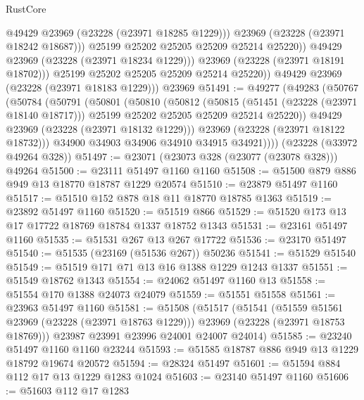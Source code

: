 \begin{lexlean}{RustCore}
\begin{coremodule}
                      @49429
                      @23969
                      (@23228 (@23971 @18285 @1229)))
                    @23969
                    (@23228 (@23971 @18242 @18687)))
                  @25199
                  @25202
                  @25205
                  @25209
                  @25214
                  @25220))
              @49429
              @23969
              (@23228 (@23971 @18234 @1229)))
            @23969
            (@23228 (@23971 @18191 @18702)))
          @25199
          @25202
          @25205
          @25209
          @25214
          @25220))
      @49429
      @23969
      (@23228 (@23971 @18183 @1229)))
    @23969
@51491 := @49277
    (@49283
      (@50767
        (@50784
          (@50791
            (@50801
              (@50810
                (@50812
                  (@50815
                    (@51451 (@23228 (@23971 @18140 @18717)))
                    @25199
                    @25202
                    @25205
                    @25209
                    @25214
                    @25220))
                @49429
                @23969
                (@23228 (@23971 @18132 @1229)))
              @23969
              (@23228 (@23971 @18122 @18732)))
            @34900
            @34903
            @34906
            @34910
            @34915
            @34921))))
    (@23228 (@33972 @49264 @328))
@51497 := @23071 (@23073 @328 (@23077 (@23078 @328))) @49264
@51500 := @23111 @51497 @1160 @1160
@51508 := @51500 @879 @886 @949 @13 @18770 @18787 @1229 @20574
@51510 := @23879 @51497 @1160
@51517 := @51510 @152 @878 @18 @11 @18770 @18785 @1363
@51519 := @23892 @51497 @1160
@51520 := @51519 @866
@51529 := @51520 @173 @13 @17 @17722 @18769 @18784 @1337 @18752 @1343
@51531 := @23161 @51497 @1160
@51535 := @51531 @267 @13 @267 @17722
@51536 := @23170 @51497
@51540 := @51535 (@23169 (@51536 @267)) @50236
@51541 := @51529 @51540
@51549 := @51519 @171 @71 @13 @16 @1388 @1229 @1243 @1337
@51551 := @51549 @18762 @1343
@51554 := @24062 @51497 @1160 @13
@51558 := @51554 @170 @1388 @24073 @24079
@51559 := @51551 @51558
@51561 := @23963 @51497 @1160
@51581 := @51508
    (@51517
      (@51541
        (@51559 @51561 @23969 (@23228 (@23971 @18763 @1229)))
        @23969
        (@23228 (@23971 @18753 @18769)))
      @23987
      @23991
      @23996
      @24001
      @24007
      @24014)
@51585 := @23240 @51497 @1160 @1160 @23244
@51593 := @51585 @18787 @886 @949 @13 @1229 @18792 @19674 @20572
@51594 := @28324 @51497
@51601 := @51594 @884 @112 @17 @13 @1229 @1283 @1024
@51603 := @23140 @51497 @1160
@51606 := @51603 @112 @17 @1283

\end{coremodule}
\end{lexlean}
